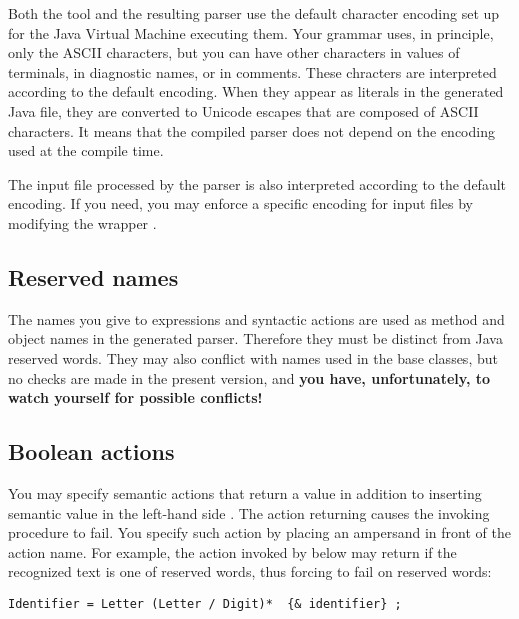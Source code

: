 Both the  tool and the resulting parser use the default 
character encoding set up for the Java Virtual Machine executing them.
%
Your grammar uses, in principle, only the ASCII characters, 
but you can have other characters in values of terminals, 
in diagnostic names, or in comments.
These chracters are interpreted according to the default encoding.
When they appear as literals in the generated Java file,
they are converted to Unicode escapes that are composed of ASCII characters.
It means that the compiled parser does not depend on the 
encoding used at the compile time.

The input file processed by the parser is also interpreted 
according to the default encoding.
If you need, you may enforce a specific encoding for input files
by modifying the wrapper .


\subsection{Reserved names}

The names you give to expressions and syntactic actions are used as  
method and object names in the generated parser.
Therefore they must be distinct from Java reserved words.
They may also conflict with names used in the base classes,
but no checks are made in the present version, and
\textbf{you have, unfortunately, to watch yourself for possible conflicts!}
 

\subsection{Boolean actions}

You may specify semantic actions that return a  value
in addition to inserting semantic value in the left-hand side \Phrase.
The action returning  causes the invoking procedure to fail.
You specify such action by placing an ampersand in front of the action name.
For example, the action  invoked by  below
may return  if the recognized text is one of reserved words,
thus forcing  to fail on reserved words:

\small
\begin{Verbatim}[frame=single,framesep=2mm,samepage=true,xleftmargin=15mm,xrightmargin=15mm,baselinestretch=0.8]
   Identifier = Letter (Letter / Digit)*  {& identifier} ;
\end{Verbatim}
\normalsize


